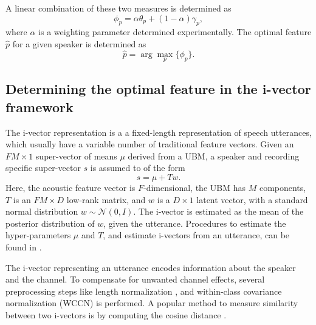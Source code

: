 \documentclass[preprint,12pt,5p]{elsarticle}
\begin{document}


A linear combination of these two measures is determined as
\begin{equation}
\phi_p = \alpha \theta_p  + (1-\alpha) \gamma_p,
\label{eq:phiFunc}
\end{equation}
where $\alpha$ is a weighting parameter determined experimentally. The optimal
feature $\hat{p}$ for a given speaker is determined as 
\begin{equation}
\hat{p} = \arg\max_p \{\phi_p\}.
\label{eq:ubm_optFeat}
\end{equation}

\subsection{Determining the optimal feature in the i-vector framework}
\label{subsec:ivec_optFeat}

The i-vector representation \cite{dehak_ivector} is a a fixed-length
representation of speech utterances, which usually have a variable number of
traditional feature vectors.  Given an $FM \times 1$ super-vector of means $\mu$
derived from a UBM, a speaker and recording specific super-vector $s$ is assumed to of
the form
\begin{equation}
s = \mu + T w.
\end{equation}
Here, the acoustic feature vector is $F$-dimensional, the UBM has $M$ components,
$T$ is an $FM \times D$ low-rank matrix, and $w$ is a $D \times 1$ latent
vector, with a standard normal distribution $w \sim \mathcal{N}(0,I)$. The
i-vector is estimated as the mean of the posterior distribution of $w$, given
the utterance. Procedures to estimate the hyper-parameters $\mu$ and $T$, and 
estimate i-vectors from an utterance, can be found in \cite{dehak_ivector}.

The i-vector representing an utterance encodes information about 
the speaker and the channel. To compensate for unwanted channel effects,
several preprocessing steps like length normalization \cite{garcia_lengthNorm},
and within-class covariance normalization (WCCN) \cite{wccn} is performed. A
popular method to measure similarity between two i-vectors is by computing the
cosine distance \cite{dehak_ivector}.
\end{document}
